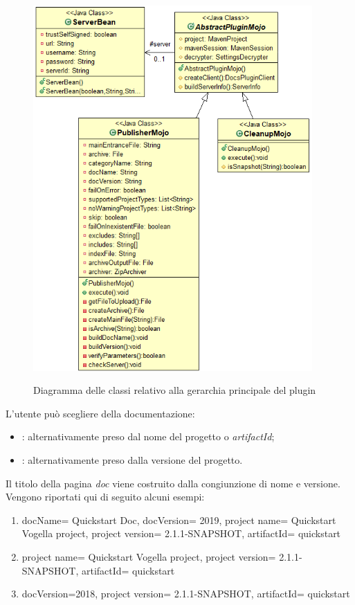\begin{figure}[H]
    \centering
    \includegraphics[width=0.95\textwidth]{immagini/mojo-gerarchy.png}\\
    \caption{Diagramma delle classi relativo alla gerarchia principale del plugin}
\end{figure}


L'utente può scegliere della documentazione:
	\begin{itemize}
		\item {}: alternativamente preso dal nome del progetto o \emph{artifactId};
		\item {}: alternativamente preso dalla versione del progetto.
	\end{itemize} 
Il titolo della pagina \emph{doc} viene costruito dalla congiunzione di nome e versione.
Vengono riportati qui di seguito alcuni esempi:
	\begin{enumerate}
		\item docName= Quickstart Doc, docVersion= 2019, project name= Quickstart Vogella project, project version= 2.1.1-SNAPSHOT, artifactId= quickstart
		\item project name= Quickstart Vogella project, project version= 2.1.1-SNAPSHOT,  artifactId= quickstart
		\item docVersion=2018, project version= 2.1.1-SNAPSHOT,  artifactId= quickstart
	\end{enumerate}

